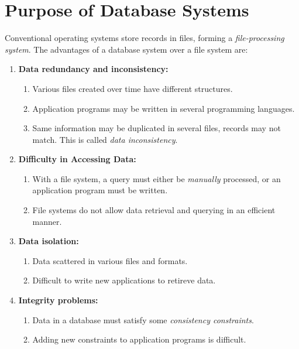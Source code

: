 \documentclass[journal,12pt,twocolumn]{IEEEtran}
\begin{document}
\section{Purpose of Database Systems}

Conventional operating systems store records in files, forming a 
\textit{file-processing system}. The advantages of a database system over a 
file system are:

\begin{enumerate}
    \item \textbf{Data redundancy and inconsistency:}
    \begin{enumerate}
        \item Various files created over time have different structures.
        \item Application programs may be written in several programming 
        languages.
        \item Same information may be duplicated in several files, records may
         not match. This is called \textit{data inconsistency}.
    \end{enumerate}

    \item \textbf{Difficulty in Accessing Data:}
    \begin{enumerate}
        \item With a file system, a query must either be \textit{manually}
         processed, or an application program must be written.
        \item File systems do not allow data retrieval and querying in an 
        efficient manner.
    \end{enumerate}

    \item \textbf{Data isolation:}
    \begin{enumerate}
        \item Data scattered in various files and formats.
        \item Difficult to write new applications to retireve data.
    \end{enumerate}

    \item \textbf{Integrity problems:}
    \begin{enumerate}
        \item Data in a database must satisfy some \textit{consistency 
        constraints}.
        \item Adding new constraints to application programs is difficult.
    \end{enumerate}


\end{enumerate}
\end{document}
